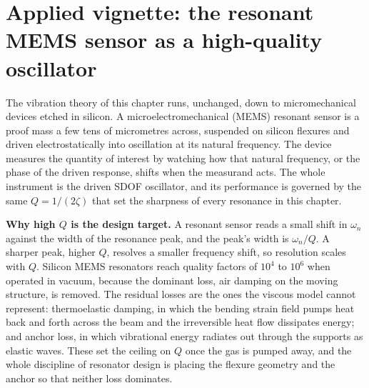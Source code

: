 \section{Applied vignette: the resonant MEMS sensor as a high-quality
oscillator}

The vibration theory of this chapter runs, unchanged, down to
micromechanical devices etched in silicon. A microelectromechanical
(MEMS) resonant sensor is a proof mass a few tens of micrometres across,
suspended on silicon flexures and driven electrostatically into
oscillation at its natural frequency. The device measures the quantity
of interest by watching how that natural frequency, or the phase of the
driven response, shifts when the measurand acts. The whole instrument is
the driven SDOF oscillator, and its performance is governed by the same
$Q = 1/(2\zeta)$ that set the sharpness of every resonance in this
chapter.

\textbf{Why high $Q$ is the design target.} A resonant sensor reads a
small shift in $\omega_n$ against the width of the resonance peak, and
the peak's width is $\omega_n/Q$. A sharper peak, higher $Q$, resolves a
smaller frequency shift, so resolution scales with $Q$. Silicon MEMS
resonators reach quality factors of $10^4$ to $10^6$ when operated in
vacuum, because the dominant loss, air damping on the moving structure,
is removed. The residual losses are the ones the viscous model cannot
represent: thermoelastic damping, in which the bending strain field
pumps heat back and forth across the beam and the irreversible heat flow
dissipates energy; and anchor loss, in which vibrational energy radiates
out through the supports as elastic waves. These set the ceiling on $Q$
once the gas is pumped away, and the whole discipline of resonator
design is placing the flexure geometry and the anchor so that neither
loss dominates.

